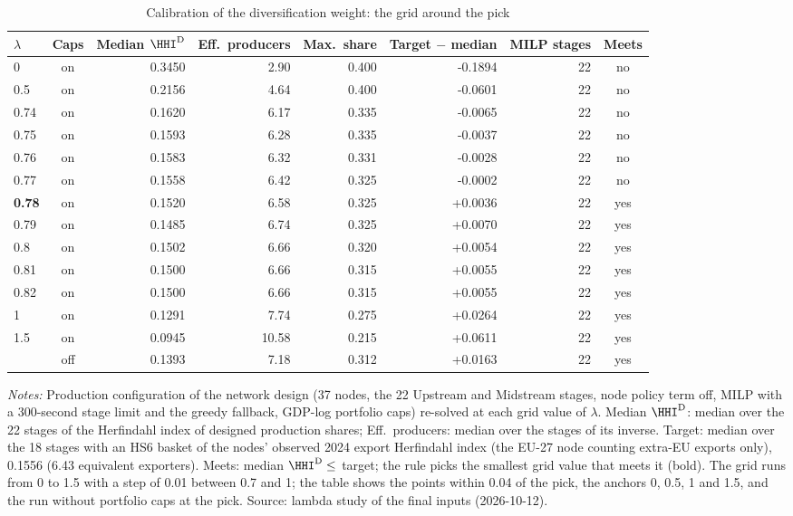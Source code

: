\begin{table}[htbp]
\centering
\begin{threeparttable}
\caption{Calibration of the diversification weight: the grid around the pick}
\label{tab:network_frontier}
\footnotesize
\begin{tabular}{@{}l c r r r r r c@{}}
\toprule
$\lambda$ & Caps & Median $\HHI^{\mathrm{D}}$ & Eff.\ producers & Max.\ share & Target $-$ median & MILP stages & Meets \\
\midrule
0 & on & 0.3450 & 2.90 & 0.400 & -0.1894 & 22 & no \\
0.5 & on & 0.2156 & 4.64 & 0.400 & -0.0601 & 22 & no \\
0.74 & on & 0.1620 & 6.17 & 0.335 & -0.0065 & 22 & no \\
0.75 & on & 0.1593 & 6.28 & 0.335 & -0.0037 & 22 & no \\
0.76 & on & 0.1583 & 6.32 & 0.331 & -0.0028 & 22 & no \\
0.77 & on & 0.1558 & 6.42 & 0.325 & -0.0002 & 22 & no \\
\textbf{0.78} & on & 0.1520 & 6.58 & 0.325 & +0.0036 & 22 & yes \\
0.79 & on & 0.1485 & 6.74 & 0.325 & +0.0070 & 22 & yes \\
0.8 & on & 0.1502 & 6.66 & 0.320 & +0.0054 & 22 & yes \\
0.81 & on & 0.1500 & 6.66 & 0.315 & +0.0055 & 22 & yes \\
0.82 & on & 0.1500 & 6.66 & 0.315 & +0.0055 & 22 & yes \\
1 & on & 0.1291 & 7.74 & 0.275 & +0.0264 & 22 & yes \\
1.5 & on & 0.0945 & 10.58 & 0.215 & +0.0611 & 22 & yes \\
\addlinespace
0.78 & off & 0.1393 & 7.18 & 0.312 & +0.0163 & 22 & yes \\
\bottomrule
\end{tabular}
\begin{tablenotes}[flushleft]\footnotesize
\item \emph{Notes:} Production configuration of the network design (37 nodes, the 22 Upstream and Midstream stages, node policy term off, MILP with a 300-second stage limit and the greedy fallback, GDP-log portfolio caps) re-solved at each grid value of $\lambda$. Median $\HHI^{\mathrm{D}}$: median over the 22 stages of the Herfindahl index of designed production shares; Eff.\ producers: median over the stages of its inverse. Target: median over the 18 stages with an HS6 basket of the nodes' observed 2024 export Herfindahl index (the EU-27 node counting extra-EU exports only), 0.1556 (6.43 equivalent exporters). Meets: median $\HHI^{\mathrm{D}}\le$ target; the rule picks the smallest grid value that meets it (bold). The grid runs from 0 to 1.5 with a step of 0.01 between 0.7 and 1; the table shows the points within 0.04 of the pick, the anchors 0, 0.5, 1 and 1.5, and the run without portfolio caps at the pick. Source: lambda study of the final inputs (2026-10-12).
\end{tablenotes}
\end{threeparttable}
\end{table}
